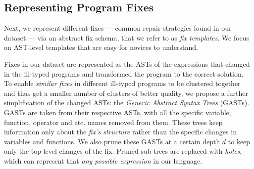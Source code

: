 


\subsection{Representing Program Fixes}
\label{subsec:step2}

Next, we represent different fixes --- \ie common repair strategies found in our
dataset --- via an abstract fix schema, that we refer to as \emph{fix
templates}. We focus on AST-level templates that are easy for novices to
understand.

Fixes in our dataset are represented as the ASTs of the expressions that changed
in the ill-typed programs and transformed the program to the correct solution.
To enable \emph{similar fixes} in different ill-typed programs to be clustered
together and thus get a smaller number of clusters of better quality, we propose
a further simplification of the changed ASTs: the \emph{Generic Abstract Syntax
Trees} (GASTs). GASTs are taken from their respective ASTs, with all the
specific variable, function, operator and etc. names removed from them. These
trees keep information only about the \emph{fix's structure} rather than the
specific changes in variables and functions. We also prune these GASTs at a
certain depth $d$ to keep only the top-level changes of the fix. Pruned
sub-trees are replaced with \emph{holes}, which can represent that \emph{any
possible expression} in our language.


